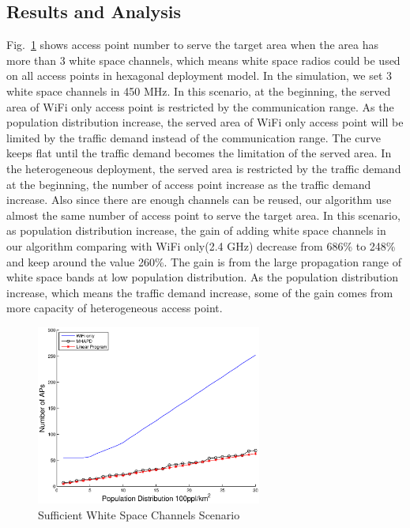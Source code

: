 \subsection{Results and Analysis} 
\label{subsec:result}

Fig.~\ref{fig:enoughchannels} shows access point number to serve the target area when 
the area has more than 3 white space channels, which means white space radios could be used
on all access points in hexagonal deployment model. In the simulation, we set 3 white space channels
in 450 MHz. In this scenario, at the beginning, the served area of WiFi only access point 
is restricted by the communication range. As the population distribution increase, 
the served area of WiFi only access point will be limited by the traffic demand instead 
of the communication range. The curve keeps flat until the traffic demand becomes the limitation
of the served area. In the heterogeneous deployment, the served area is restricted by the traffic
demand at the beginning, the number of access point increase as the traffic demand increase. 
Also since there are enough channels can be reused, our algorithm use almost the same number of 
access point to serve the target area. In this scenario, as population distribution increase,
the gain of adding white space channels in our algorithm comparing with WiFi only(2.4 GHz) 
decrease from 686\% to 248\% and keep around the value 260\%. The gain is from the large 
propagation range of white space bands at low population distribution.
As the population distribution increase, which means the traffic demand increase, some of the gain
comes from more capacity of heterogeneous access point.


\begin{figure}
\centering
\includegraphics[width=74mm]{figures/enoughchannels}
\vspace{-0.1in}
\caption{Sufficient White Space Channels Scenario}                                                                 
\label{fig:enoughchannels}
\vspace{-0.1in}
\end{figure}

